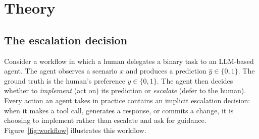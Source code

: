 \documentclass{article}
\begin{document}
\section{Theory}
\label{sec:theory}

\subsection{The escalation decision}

Consider a workflow in which a human delegates a binary task to an LLM-based agent. The agent observes a scenario $x$ and produces a prediction $\hat{y} \in \{0, 1\}$. The ground truth is the human's preference $y \in \{0, 1\}$. The agent then decides whether to \emph{implement} (act on) its prediction or \emph{escalate} (defer to the human). Every action an agent takes in practice contains an implicit escalation decision: when it makes a tool call, generates a response, or commits a change, it is choosing to implement rather than escalate and ask for guidance. Figure~\ref{fig:workflow} illustrates this workflow.
\end{document}
